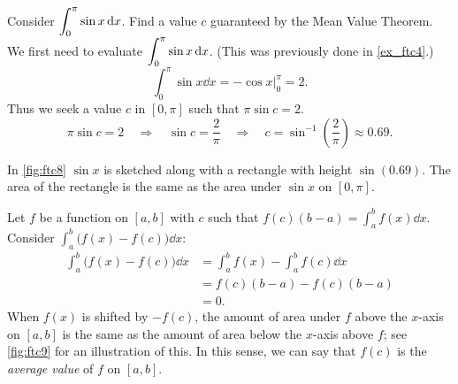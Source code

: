 \begin{example}\label{ex_ftc8}%
Consider $\displaystyle\int_0^\pi \sin x\operatorname{d}\! x$. Find a value $c$ guaranteed by the Mean Value Theorem.
\solution
We first need to evaluate $\displaystyle\int_0^\pi \sin x\operatorname{d}\! x$. (This was previously done in \autoref{ex_ftc4}.)
\[\int_0^\pi\sin x\dd x = -\cos x \Big|_0^\pi = 2.\]
Thus we seek a value $c$ in $[0,\pi]$ such that $\pi\sin c =2$. 
\[
 \pi\sin c = 2\quad \Rightarrow\quad
 \sin c =\frac2\pi\quad \Rightarrow\quad
 c = \sin^{-1}\left(\frac2\pi\right) \approx 0.69.
\]

In \autoref{fig:ftc8} $\sin x$ is sketched along with a rectangle with height $\sin (0.69)$. The area of the rectangle is the same as the area under $\sin x$ on $[0,\pi]$.
\end{example}

Let $f$ be a function on $[a,b]$ with $c$ such that $f(c)(b-a) = \int_a^bf(x)\dd x$. Consider $\int_a^b\bigl(f(x)-f(c)\bigr)\dd x$:
\begin{align*}
	\int_a^b\bigl(f(x)-f(c)\bigr)\dd x
	&= \int_a^b f(x) - \int_a^b f(c)\dd x\\
	&= f(c)(b-a) - f(c)(b-a) \\
	&= 0.
\end{align*}
When $f(x)$ is shifted by $-f(c)$, the amount of area under $f$ above the $x$-axis on $[a,b]$ is the same as the amount of area below the $x$-axis above $f$; see \autoref{fig:ftc9} for an illustration of this. In this sense, we can say that $f(c)$ is the \emph{average value} of $f$ on $[a,b]$. 

